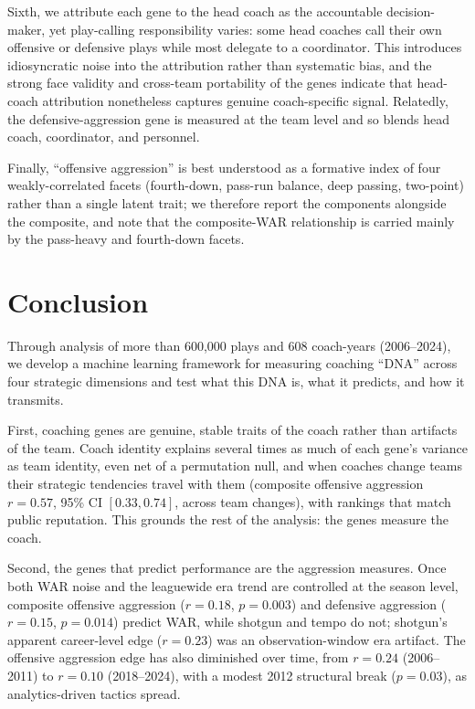 \documentclass[USenglish]{article}
\theoremstyle{dgthm}
\theoremstyle{dgdef}
\begin{document}
Sixth, we attribute each gene to the head coach as the accountable decision-maker, yet play-calling responsibility varies: some head coaches call their own offensive or defensive plays while most delegate to a coordinator. This introduces idiosyncratic noise into the attribution rather than systematic bias, and the strong face validity and cross-team portability of the genes indicate that head-coach attribution nonetheless captures genuine coach-specific signal. Relatedly, the defensive-aggression gene is measured at the team level and so blends head coach, coordinator, and personnel.

Finally, ``offensive aggression'' is best understood as a formative index of four weakly-correlated facets (fourth-down, pass-run balance, deep passing, two-point) rather than a single latent trait; we therefore report the components alongside the composite, and note that the composite-WAR relationship is carried mainly by the pass-heavy and fourth-down facets.

\section{Conclusion}

Through analysis of more than 600,000 plays and 608 coach-years (2006--2024), we develop a machine learning framework for measuring coaching ``DNA'' across four strategic dimensions and test what this DNA is, what it predicts, and how it transmits.

First, coaching genes are genuine, stable traits of the coach rather than artifacts of the team. Coach identity explains several times as much of each gene's variance as team identity, even net of a permutation null, and when coaches change teams their strategic tendencies travel with them (composite offensive aggression $r=0.57$, 95\% CI $[0.33, 0.74]$, across team changes), with rankings that match public reputation. This grounds the rest of the analysis: the genes measure the coach.

Second, the genes that predict performance are the aggression measures. Once both WAR noise and the leaguewide era trend are controlled at the season level, composite offensive aggression ($r=0.18$, $p=0.003$) and defensive aggression ($r=0.15$, $p=0.014$) predict WAR, while shotgun and tempo do not; shotgun's apparent career-level edge ($r=0.23$) was an observation-window era artifact. The offensive aggression edge has also diminished over time, from $r=0.24$ (2006--2011) to $r=0.10$ (2018--2024), with a modest 2012 structural break ($p=0.03$), as analytics-driven tactics spread.
\end{document}
